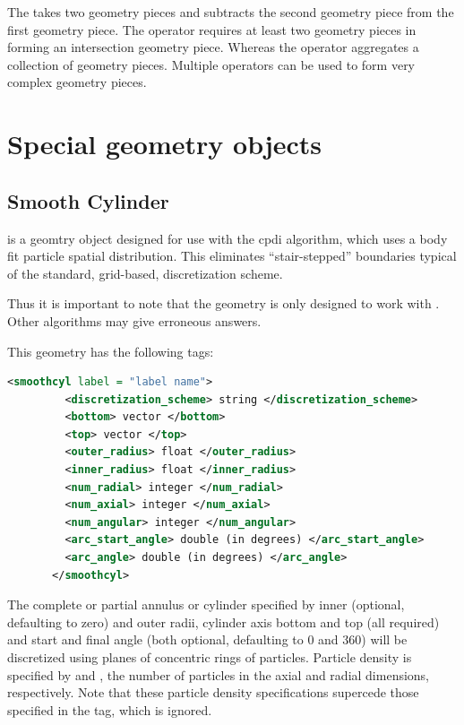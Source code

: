 The  takes two geometry pieces and subtracts
the second geometry piece from the first geometry piece.  The  operator requires at least two geometry
pieces in forming an intersection geometry piece.  Whereas the  operator aggregates a collection of geometry pieces.
Multiple operators can be used to form very complex geometry pieces.


\section{Special geometry objects} \label{Sec:SpecialGeometryObjects}
\subsection{Smooth Cylinder}
 is a geomtry object designed for use with
the cpdi algorithm, which uses a body fit particle spatial
distribution.  This eliminates ``stair-stepped'' boundaries typical of
the standard, grid-based, discretization scheme.  
\begin{NoteBox}
Thus it is
  important to note that the  geometry is only designed to work with
  . Other
  algorithms may give erroneous answers.
\end{NoteBox}

This geometry has the following tags:

\begin{lstlisting}[language=XML]
	   <smoothcyl label = "label name">
	     <discretization_scheme> string </discretization_scheme>
	     <bottom> vector </bottom>
	     <top> vector </top>
	     <outer_radius> float </outer_radius>
	     <inner_radius> float </inner_radius>
	     <num_radial> integer </num_radial>
	     <num_axial> integer </num_axial>
	     <num_angular> integer </num_angular>
	     <arc_start_angle> double (in degrees) </arc_start_angle>
	     <arc_angle> double (in degrees) </arc_angle>
	   </smoothcyl>
\end{lstlisting}

The complete or partial annulus or cylinder specified by inner
(optional, defaulting to zero) and outer radii, cylinder axis bottom
and top (all required) and start and final angle (both optional,
defaulting to 0 and 360) will be discretized using planes of
concentric rings of particles.  Particle density is specified by  and , the number of
particles in the axial and radial dimensions, respectively.
  Note that these particle density specifications
supercede those specified in the 
tag, which is ignored.

